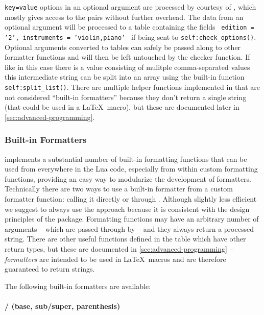 \documentclass{scrartcl}
\begin{document}
\texttt{key=value} options in an optional argument are processed by courtesy of
, which mostly gives access to the pairs without further
overhead.  The data from an optional argument
\texttt{\foo[edition=2,instruments={violin,piano}]} will be processed
to a table containing the fields \texttt{{ edition = '2', instruments =
'violin,piano' }} if being sent to \texttt{self:check_options()}.
Optional arguments converted to tables can safely be passed along to other
formatter functions and will then be left untouched by the checker function.  If
like in this case there is a value consisting of mulitple comma-separated values
this intermediate string can be split into an array using the built-in function
\texttt{self:split_list()}.  There are multiple helper functions
implemented in  that are not considered “built-in
formatters” because they don't return a single string (that could be used in a
\LaTeX\ macro), but these are documented later in
\vref{sec:advanced-programming}.


\subsubsection{Built-in Formatters}
\label{sec:builtin-formatters}

 implements a substantial number of built-in formatting
functions that can be used from everywhere in the Lua code, especially from
within custom formatting functions, providing an easy way to modularize the
development of formatters.  Technically there are two ways to use a built-in
formatter from a custom formatter function: calling it directly or through
.  Although slightly less efficient we suggest to always
use the  approach because it is consistent with the design
principles of the package.  Formatting functions may have an arbitrary number of
arguments -- which are passed through by  -- and they always
return a processed string.  There are other useful functions defined in the
 table which have other return types, but these are documented
in \vref{sec:advanced-programming} -- \emph{formatters} are intended to be used
in \LaTeX\ macros and are therefore guaranteed to return strings.

\medskip

\noindent
The following built-in formatters are available:

\paragraph{ /  (base, sub/super, parenthesis)}
\end{document}
